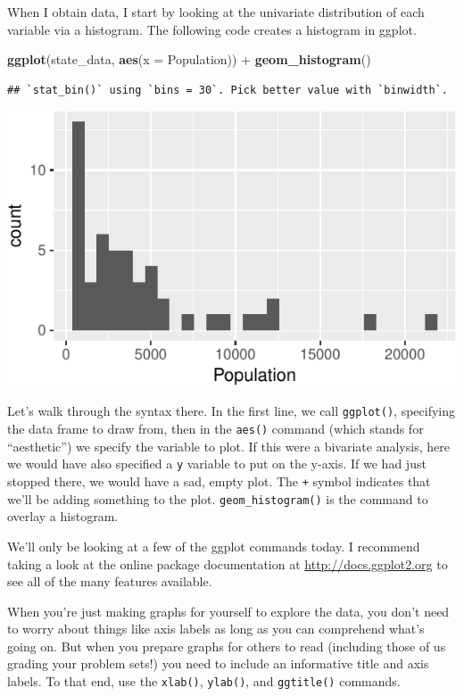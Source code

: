 \documentclass[12pt,oneside,openany]{book}
\newenvironment{Shaded}{\begin{snugshade}}{\end{snugshade}}
\newcommand{\KeywordTok}[1]{\textcolor[rgb]{0.13,0.29,0.53}{\textbf{{#1}}}}
\newcommand{\DataTypeTok}[1]{\textcolor[rgb]{0.13,0.29,0.53}{{#1}}}
\newcommand{\StringTok}[1]{\textcolor[rgb]{0.31,0.60,0.02}{{#1}}}
\newcommand{\NormalTok}[1]{{#1}}
\begin{document}
When I obtain data, I start by looking at the univariate distribution of
each variable via a histogram. The following code creates a histogram in
ggplot.

\begin{Shaded}
\begin{Highlighting}[]
\KeywordTok{ggplot}\NormalTok{(state_data, }\KeywordTok{aes}\NormalTok{(}\DataTypeTok{x =} \NormalTok{Population)) +}
\StringTok{  }\KeywordTok{geom_histogram}\NormalTok{()}
\end{Highlighting}
\end{Shaded}

\begin{verbatim}
## `stat_bin()` using `bins = 30`. Pick better value with `binwidth`.
\end{verbatim}

\includegraphics{pdaps_files/figure-latex/histogram-1.pdf}

Let's walk through the syntax there. In the first line, we call
\texttt{ggplot()}, specifying the data frame to draw from, then in the
\texttt{aes()} command (which stands for ``aesthetic'') we specify the
variable to plot. If this were a bivariate analysis, here we would have
also specified a \texttt{y} variable to put on the y-axis. If we had
just stopped there, we would have a sad, empty plot. The \texttt{+}
symbol indicates that we'll be adding something to the plot.
\texttt{geom\_histogram()} is the command to overlay a histogram.

We'll only be looking at a few of the ggplot commands today. I recommend
taking a look at the online package documentation at
\url{http://docs.ggplot2.org} to see all of the many features available.

When you're just making graphs for yourself to explore the data, you
don't need to worry about things like axis labels as long as you can
comprehend what's going on. But when you prepare graphs for others to
read (including those of us grading your problem sets!) you need to
include an informative title and axis labels. To that end, use the
\texttt{xlab()}, \texttt{ylab()}, and \texttt{ggtitle()} commands.
\end{document}
